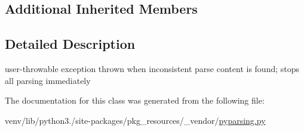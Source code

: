 \subsection*{Additional Inherited Members}


\subsection{Detailed Description}
\begin{DoxyVerb}user-throwable exception thrown when inconsistent parse content
   is found; stops all parsing immediately\end{DoxyVerb}
 

The documentation for this class was generated from the following file\+:\begin{DoxyCompactItemize}
\item 
venv/lib/python3./site-\/packages/pkg\+\_\+resources/\+\_\+vendor/\hyperlink{pkg__resources_2__vendor_2pyparsing_8py}{pyparsing.\+py}\end{DoxyCompactItemize}

